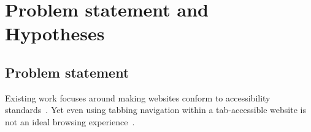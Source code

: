 \documentclass[11pt,openright,a4paper]{report}
\begin{document}
\section{Problem statement and Hypotheses}
\subsection{Problem statement}
Existing work focuses around making websites conform to accessibility standards~\cite{chisholm2001web,wcag}. Yet even using tabbing navigation within a tab-accessible website is not an ideal browsing experience~\cite{schrepp2006efficiency,coyne2001beyond,powlik2002accessibility}.
\end{document}
